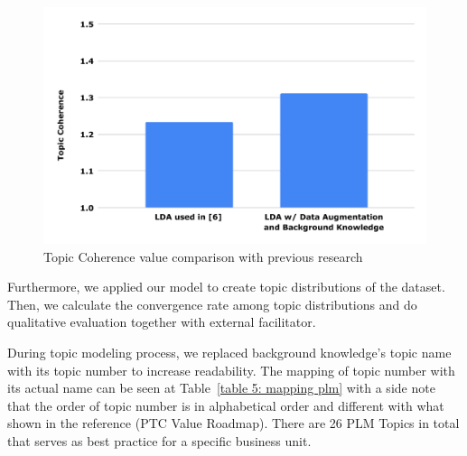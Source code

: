 \documentclass[10pt, conference, compsocconf]{IEEEtran}
\begin{document}
\begin{figure}[b]
	\includegraphics[scale=0.425]{new-topic3.pdf}
	\caption{Topic Coherence value comparison with previous research}
\label{fig_tme3}
\end{figure}

Furthermore, we applied our model to create topic distributions of the dataset. Then, we calculate the convergence rate among topic distributions and do qualitative evaluation together with external facilitator. 

During topic modeling process, we replaced background knowledge's topic name with its topic number to increase readability. The mapping of topic number with its actual name can be seen at Table~\ref{table 5: mapping plm} with a side note that the order of topic number is in alphabetical order and different with what shown in the reference (PTC Value Roadmap). There are 26 PLM Topics in total that serves as best practice for a specific business unit.
\end{document}
